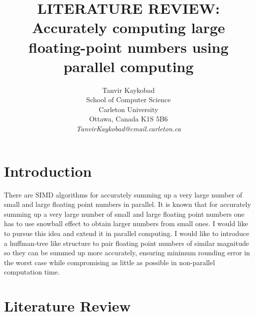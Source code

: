 \documentclass[11pt]{article}       %
\begin{document}


\title{LITERATURE REVIEW: Accurately computing large floating-point numbers using parallel computing}


\author{
Tanvir Kaykobad\\
School of Computer Science\\
Carleton University\\
Ottawa, Canada K1S 5B6\\
{\em TanvirKaykobad@cmail.carleton.ca}
} %

\maketitle



\section{Introduction} \label{intro}

There are SIMD algorithms for accurately summing up a very large number of small and large floating point numbers in parallel. It is known that for accurately summing up a very large number of small and large floating point numbers one has to use snowball effect to obtain larger numbers from small ones. I would like to pursue this idea and extend it in parallel computing. I would like to introduce a huffman-tree like structure to pair floating point numbers of similar magnitude so they can be summed up more accurately, ensuring minimum rounding error in the worst case while compromising as little as possible in non-parallel computation time.

\section{Literature Review} \label{litrev}
\end{document}

